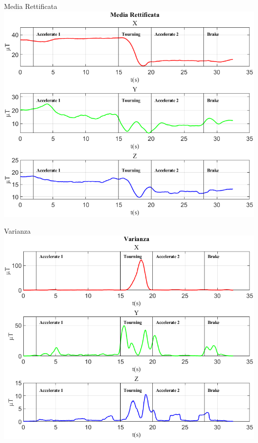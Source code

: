 \documentclass[beamer]{standalone}
\begin{document}
	\begin{frame}{{Media Rettificata}}
		\centering\includegraphics[height=.8\textheight]{figure/Mag/Media Rettificata}
	\end{frame}
	
	\begin{frame}{{Varianza}}
		\centering\includegraphics[height=.8\textheight]{figure/Mag/Varianza}
	\end{frame}
	
	
\end{document}
